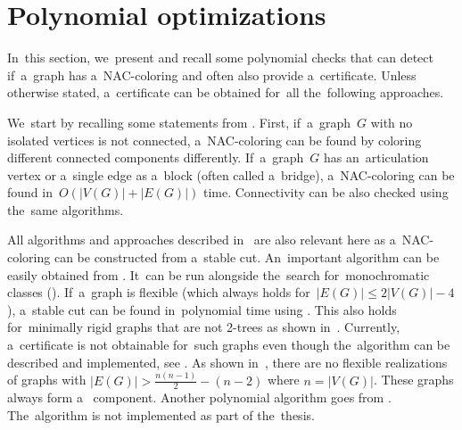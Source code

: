 \section{Polynomial optimizations}%
\label{sec:polynomial_optimizations}

In~this section, we~present and recall some polynomial checks
that can detect if~a~graph has a~NAC-coloring and often also provide a~certificate.
Unless otherwise stated, a~certificate can be obtained for~all the~following approaches.

We~start by recalling some statements from .
%
First, if~a~graph~\( G \) with no isolated vertices is not connected,
a~NAC-coloring can be found by coloring different connected components differently.
%
If~a~graph~\( G \) has an~articulation vertex or
a~single edge as a~block (often called a~bridge),
a~NAC-coloring can be found in~\( O(|V(G)|+|E(G)|) \) time.
Connectivity can be also checked using the~same algorithms.

All algorithms and approaches described in~
are also relevant here as a~NAC-coloring can be constructed from a~stable cut.
An~important algorithm can be easily obtained from .
It~can be run alongside the~search for~monochromatic classes ().
%
If~a~graph is flexible (which always holds for~\( |E(G)| \le 2|V(G)|-4 \)),
a~stable cut can be found in~polynomial time using .
This also holds for~minimally rigid graphs that are not 2-trees as shown in~.
Currently, a~certificate is not obtainable for~such graphs
even though the~algorithm can be described and implemented, see .
%
As shown in~\cite{legersky_original}, there are no flexible realizations
of graphs with \( |E(G)| > \frac{n(n-1)}{2} - (n-2) \) where \( n = |V(G)| \).
These graphs always form a~\trcon{} component.
%
Another polynomial algorithm goes from .
The~algorithm is not implemented as part of the~thesis.

